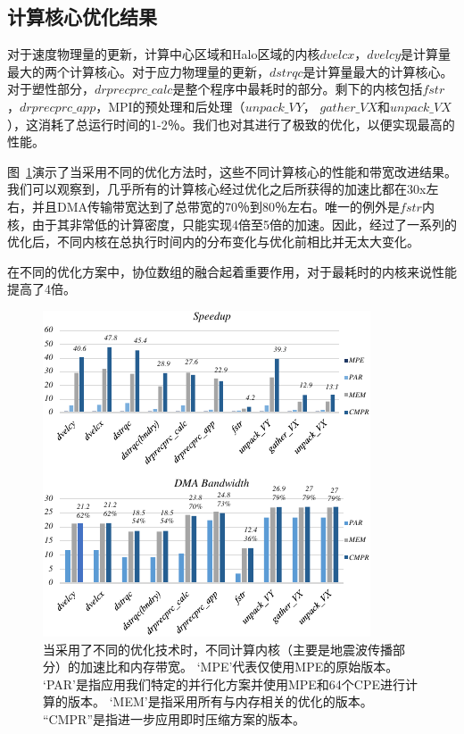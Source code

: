 \documentclass[degree=doctor]{thuthesis}
\begin{document}
\subsection{计算核心优化结果}

对于速度物理量的更新，计算中心区域和Halo区域的内核$ dvelcx，dvelcy $是计算量最大的两个计算核心。对于应力物理量的更新，$ dstrqc $是计算量最大的计算核心。对于塑性部分，$ drprecprc\_calc $是整个程序中最耗时的部分。剩下的内核包括$ fstr $，$ drprecprc\_app $，MPI的预处理和后处理（$ unpack\_VY $，
$ gather\_VX $和$ unpack\_VX $），这消耗了总运行时间的1-2％。我们也对其进行了极致的优化，以便实现最高的性能。

图~\ref{fig:kernel-result}演示了当采用不同的优化方法时，这些不同计算核心的性能和带宽改进结果。我们可以观察到，几乎所有的计算核心经过优化之后所获得的加速比都在30x左右，并且DMA传输带宽达到了总带宽的70％到80％左右。唯一的例外是$ fstr $内核，由于其非常低的计算密度，只能实现4倍至5倍的加速。因此，经过了一系列的优化后，不同内核在总执行时间内的分布变化与优化前相比并无太大变化。

在不同的优化方案中，协位数组的融合起着重要作用，对于最耗时的内核来说性能提高了4倍。

\begin{figure}[t]
\centering
\includegraphics[width=0.9\columnwidth]{awp_performance.pdf}
\caption{当采用了不同的优化技术时，不同计算内核（主要是地震波传播部分）的加速比和内存带宽。 `MPE'代表仅使用MPE的原始版本。 `PAR'是指应用我们特定的并行化方案并使用MPE和64个CPE进行计算的版本。 `MEM'是指采用所有与内存相关的优化的版本。 “CMPR”是指进一步应用即时压缩方案的版本。}
\label{fig:kernel-result}
\end{figure}
\end{document}

